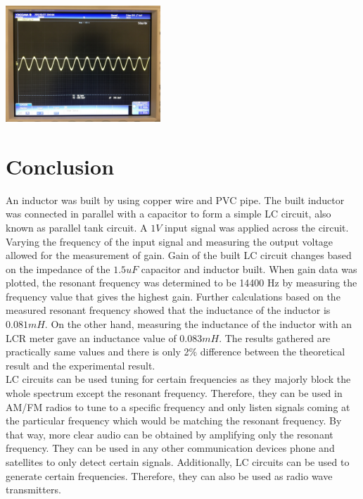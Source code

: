 \documentclass[journal]{IEEEtran}
\begin{document}
\begingroup
    \centering
    \includegraphics[width=220]{images/lab5_3.jpg}
    \label{fig:5khz}
\endgroup


\section{Conclusion} 

\noindent An inductor was built by using copper wire and PVC pipe. The built inductor was connected in parallel with a capacitor to form a simple LC circuit, also known as parallel tank circuit. A $1V$ input signal was applied across the circuit. Varying the frequency of the input signal and measuring the output voltage allowed for the measurement of gain. Gain of the built LC circuit changes based on the impedance of the $1.5uF$ capacitor and inductor built. When gain data was plotted, the resonant frequency was determined to be 14400 Hz by measuring the frequency value that gives the highest gain. Further calculations based on the measured resonant frequency showed that the inductance of the inductor is $0.081mH$. On the other hand, measuring the inductance of the inductor with an LCR meter gave an inductance value of $0.083mH$. The results gathered are practically same values and there is only 2\% difference between the theoretical result and the experimental result.\\

\noindent LC circuits can be used tuning for certain frequencies as they majorly block the whole spectrum except the resonant frequency. Therefore, they can be used in AM/FM radios to tune to a specific frequency and only listen signals coming at the particular frequency which would be matching the resonant frequency. By that way, more clear audio can be obtained by amplifying only the resonant frequency. They can be used in any other communication devices phone and satellites to only detect certain signals. Additionally, LC circuits can be used to generate certain frequencies. Therefore, they can also be used as radio wave transmitters.
\end{document}
